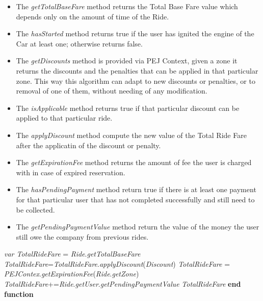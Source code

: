 \begin{itemize}
    \item The \textit{getTotalBaseFare} method returns the Total Base Fare value which depends only on the amount of time of the Ride.
    \item The \textit{hasStarted} method returns true if the user has ignited the engine of the Car at least one; otherwise returns false.
    \item The \textit{getDiscounts} method is provided via PEJ Context, given a zone it returns the discounts and the penalties that can be applied in that particular zone.\newline
    This way this algorithm can adapt to new discounts or penalties, or to removal of one of them, without needing of any modification.
    \item The \textit{isApplicable} method returns true if that particular discount can be applied to that particular ride.
    \item The \textit{applyDiscount} method compute the new value of the Total Ride Fare after the applicatin of the discount or penalty.
    \item The \textit{getExpirationFee} method returns the amount of fee the user is charged with in case of expired reservation.
    \item The \textit{hasPendingPayment} method return true if there is at least one payment for that particular user that has not completed successfully and still need to be collected.
     \item The \textit{getPendingPaymentValue} method return the value of the money the user still owe the company from previous rides.
\end{itemize}

\begin{algorithm}
\caption{}\label{euclid}
\begin{algorithmic}[1]
\State \textit{var TotalRideFare} = \textit{Ride}.\textit{getTotalBaseFare}
\State \textit{TotalRideFare}=\textit{TotalRideFare}.\textit{applyDiscount}(\textit{Discount})
\EndIf
\EndFor
\Else
\State \textit{TotalRideFare} = \textit{PEJContex}.\textit{getExpirationFee}(\textit{Ride}.\textit{getZone})
\EndIf
{}
\State \textit{TotalRideFare}+=\textit{Ride}.\textit{getUser}.\textit{getPendingPaymentValue}
\EndIf
\State \Return \textit{TotalRideFare}
\EndFunction
\State \textbf{end function}
\end{algorithmic}
\end{algorithm}

\leavevmode\thispagestyle{empty}\newpage